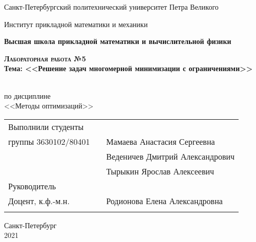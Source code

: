 \documentclass{article}
\begin{document}
\begin{titlepage}
  \begin{center}
  
     
    \large
    
    Санкт-Петербургский политехнический университет Петра Великого
    
    Институт прикладной математики и механики
    
    \textbf{Высшая школа прикладной математики и вычислительной физики}
    
    \vfill
     
     
    \textsc{\textbf{\Large{Лабораторная работа №5}}}\\[5mm]
     
    {\large \textbf{Тема: <<Решение задач многомерной  минимизации с ограничениями>>}}
    
    \\ по дисциплине\\ <<Методы оптимизаций>>\\

\end{center}

\vfill


\begin{tabular}{l p{} l}
Выполнили студенты \\группы 3630102/80401   

&  &Мамаева Анастасия Сергеевна\\
&  &Веденичев Дмитрий Александрович\\
&  &Тырыкин Ярослав Алексеевич\\

Руководитель\\Доцент, к.ф.-м.н.& \hspace{0pt} &   Родионова Елена Александровна \\\\
\end{tabular}

\hfill \break
\hfill \break
\begin{center} Санкт-Петербург \\2021 \end{center}
\thispagestyle{empty}
 
\end{titlepage}
\newpage
\begin{center}
    \setcounter{page}{2}
    \tableofcontents  
\end{center}

\newpage
\end{document}
